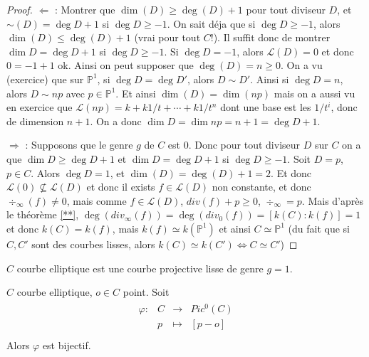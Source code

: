             \begin{proof}
                \item $\Leftarrow$ : Montrer que $\dim(D) \geq \deg(D) + 1$ pour tout diviseur $D$, et $\sim(D) = \deg D + 1$ si $\deg D \geq -1$. On sait déja que si $\deg D \geq -1$, alors $\dim(D) \leq \deg(D) + 1$ (vrai pour tout $C$!). Il suffit donc de montrer $\dim D = \deg D + 1$ si $\deg D \geq -1$. Si $\deg D = -1$, alors $\mathcal{L}(D) = 0$ et donc $0 = -1 + 1$ ok. Ainsi on peut supposer que $\deg(D) = n \geq 0$. On a vu (exercice) que sur $\mathbb{P}^1$, si $\deg D = \deg D'$, alors $D \sim D'$. Ainsi si $\deg D = n$, alors $D \sim np$ avec $p \in \mathbb{P}^1$. Et ainsi $\dim(D) = \dim(np)$ mais on a aussi vu en exercice que $\mathcal{L}(np) = k + k1/t + \cdots + k1/t^n$ dont une base est les $1/t^i$, donc de dimension $n + 1$. On a donc $\dim D = \dim np = n + 1 = \deg D + 1$.
                \item $\Rightarrow$ : Supposons que le genre $g$ de $C$ est $0$. Donc pour tout diviseur $D$ sur $C$ on a que $\dim D \geq \deg D + 1$ et $\dim D = \deg D + 1$ si $\deg D \geq -1$. Soit $D = p$, $p \in C$. Alors $\deg D = 1$, et $\dim(D) = \deg(D) + 1 = 2$. Et donc $\mathcal{L}(0) \nsubseteq \mathcal{L}(D)$ et donc il exists $f \in \mathcal{L}(D)$ non constante, et donc $\div_{\infty}(f) \neq 0$, mais comme $f \in \mathcal{L}(D)$, $div(f) + p \geq 0$, $\div_\infty = p$. Mais d'après le théorème \ref{**}, $\deg(div_\infty(f)) = \deg(div_0(f)) = [k(C): k(f)] = 1$ et donc $k(C) = k(f)$, mais $k(f) \simeq k(\mathbb{P}^1)$ et ainsi $C \simeq \mathbb{P}^1$ (du fait que si $C,C'$ sont des courbes lisses, alors $k(C) \simeq k(C') \iff C \simeq C'$)
            \end{proof}
            \begin{defi}
                $C$ courbe elliptique est une courbe projective lisse de genre $g = 1$.
            \end{defi}
            \begin{theo}
                $C$ courbe elliptique, $o \in C$ point. Soit 
                \begin{align*}
                    \begin{array}{cccc}
                        \varphi : & C & \to & Pic^0(C) \\
                        & p & \mapsto & [p - o]\\
                    \end{array}
                \end{align*}
                Alors $\varphi$ est bijectif.
            \end{theo}
